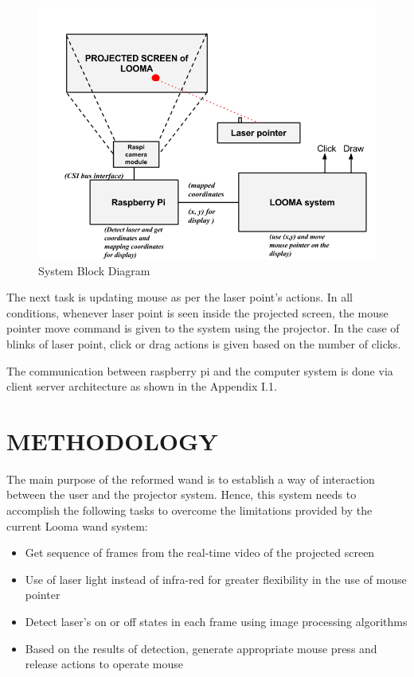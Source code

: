 \documentclass[12pt, a4paper]{article}
\begin{document}
\begin{figure}[htp]
\centering
\includegraphics[scale=0.6]{proposed_system}
\caption{System Block Diagram}
\label{Block Diagram}
\end{figure}
The next task is updating mouse as per the laser point's actions. In all conditions, whenever laser point is seen inside the projected screen, the mouse pointer move command is given to the system using the projector. In the case of blinks of laser point, click or drag actions is given based on the number of clicks. 

The communication between raspberry pi and the computer system is done via client server architecture as shown in the Appendix I.1.
\newpage
\section{METHODOLOGY}
The main purpose of the reformed wand is to establish a way of interaction between the user and the projector system. Hence, this system needs to accomplish the following tasks to overcome the limitations provided by the current Looma wand system:
\begin{itemize}
\item Get sequence of frames from the real-time video of the projected screen
\item Use of laser light instead of infra-red for greater flexibility in the use of mouse pointer
\item Detect laser’s on or off states in each frame using image processing algorithms
\item Based on the results of detection, generate appropriate mouse press and release actions to operate mouse
\end{itemize}
\end{document}

